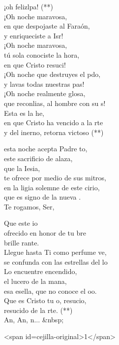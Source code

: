\begin{cancion}
\begin{chorus}
		¡oh felizlpa! (**)\\
		¡Oh noche maravosa,\\
	\jump
	en que despojaste al Faraón,\\
		y enriqueciste a Isr!\\
		¡Oh noche maravosa,\\
	\jump
	tú sola conociste la hora,\\
		en que Cristo resuci!\\
		¡Oh noche que destruyes el pdo,\\
		y lavas todas nuestras pas!\\
		¡Oh noche realmente glosa,\\
		que reconlias, al hombre con su s!\\
	\jump
		Esta es la he,\\
		en que Cristo ha vencido a la rte\\
		y del inerno, retorna victoso (**)\jump\\
	\end{chorus}%
	esta noche acepta Padre to,\\
	este sacrificio de alaza,\\
	que la Iesia,\\
	te ofrece por medio de sus mitros,\\
	en la ligia solemne de este cirio,\\
	que es signo de la nueva .\\
	\jump
	Te rogamos, Ser,\jump\\
	\begin{chorus}%
		Que este io\\
		ofrecido en honor de tu bre\\
		brille rante.\\
		Llegue hasta Ti como perfume ve,\\
		se confunda con las estrellas del lo\\
	\jump
	Lo encuentre encendido,\\
		el lucero de la mana,\\
		esa esella, que no conoce el oo.\\
	\jump
		Que es Cristo tu o, resucio,\\
		resucido de la rte. (**)\\
		An, An, n... &nbsp;\jump\\
	\end{chorus}%
<span id=cejilla-original>1</span>\\
\end{cancion}%
